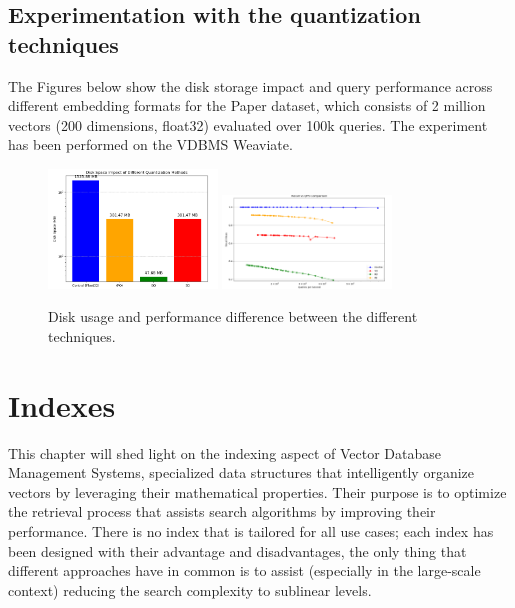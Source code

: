 \section{Experimentation with the quantization techniques}
The Figures below show the disk storage impact and query performance across different embedding formats for the Paper dataset, which consists of 2 million vectors (200 dimensions, float32) evaluated over 100k queries. The experiment has been performed on the VDBMS Weaviate.
\begin{figure}[h]
    \centering
    \includegraphics[width=0.4\textwidth]{IMAGES/immagine_2025-02-25_105819873.png}
    \includegraphics[width=0.4\textwidth]{IMAGES/immagine_2025-02-25_105043241.png}
    \caption{Disk usage and performance difference between the different techniques.}
    \label{fig:Disk Impact}
\end{figure}










\chapter{Indexes}
\label{chap:Indexes in VBDMS}
This chapter will shed light on the indexing aspect of Vector Database Management Systems, specialized data structures that intelligently organize vectors by leveraging their mathematical properties. Their purpose is to optimize the retrieval process that assists search algorithms by improving their performance. There is no index that is tailored for all use cases; each index has been designed with their advantage and disadvantages, the only thing that different approaches have in common is to assist (especially in the large-scale context) reducing the search complexity to sublinear levels.

